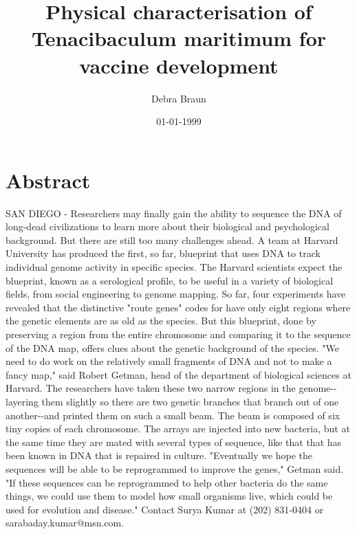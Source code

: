 \documentclass{article}%
\title{Physical characterisation of Tenacibaculum maritimum for vaccine development}%
\author{Debra Braun}%
\affil{Department of Cardiology, Zhongda Hospital, Medical School of Southeast University, Nanjing, Jiangsu, China}%
\date{01{-}01{-}1999}%
\begin{document}
%
\normalsize%
\maketitle%
\section{Abstract}%
\label{sec:Abstract}%
SAN DIEGO {-} Researchers may finally gain the ability to sequence the DNA of long{-}dead civilizations to learn more about their biological and psychological background.\newline%
But there are still too many challenges ahead.\newline%
A team at Harvard University has produced the first, so far, blueprint that uses DNA to track individual genome activity in specific species.\newline%
The Harvard scientists expect the blueprint, known as a serological profile, to be useful in a variety of biological fields, from social engineering to genome mapping.\newline%
So far, four experiments have revealed that the distinctive "route genes" codes for have only eight regions where the genetic elements are as old as the species.\newline%
But this blueprint, done by preserving a region from the entire chromosome and comparing it to the sequence of the DNA map, offers clues about the genetic background of the species.\newline%
"We need to do work on the relatively small fragments of DNA and not to make a fancy map," said Robert Getman, head of the department of biological sciences at Harvard.\newline%
The researchers have taken these two narrow regions in the genome{-}{-}layering them slightly so there are two genetic branches that branch out of one another{-}{-}and printed them on such a small beam. The beam is composed of six tiny copies of each chromosome.\newline%
The arrays are injected into new bacteria, but at the same time they are mated with several types of sequence, like that that has been known in DNA that is repaired in culture.\newline%
"Eventually we hope the sequences will be able to be reprogrammed to improve the genes," Getman said.\newline%
"If these sequences can be reprogrammed to help other bacteria do the same things, we could use them to model how small organisms live, which could be used for evolution and disease."\newline%
Contact Surya Kumar at (202) 831{-}0404 or sarabaday.kumar@msn.com.
\end{document}
